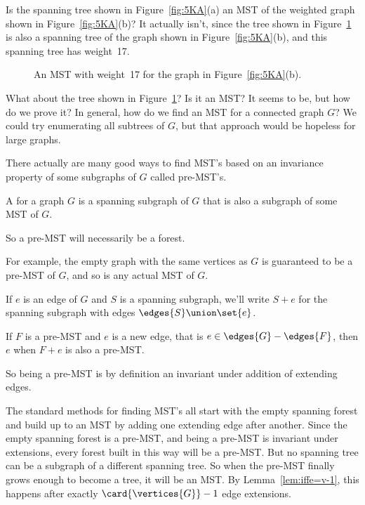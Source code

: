 Is the spanning tree shown in Figure~\ref{fig:5KA}(a) an MST of the
weighted graph shown in Figure~\ref{fig:5KA}(b)?  It actually isn't,
since the tree shown in Figure~\ref{fig:5KB} is also a spanning tree
of the graph shown in Figure~\ref{fig:5KA}(b), and this spanning tree
has weight~17.

\begin{figure}


\caption{An MST with weight~17 for the graph in
  Figure~\ref{fig:5KA}(b).}
\label{fig:5KB}

\end{figure}

What about the tree shown in Figure~\ref{fig:5KB}?  Is it an MST?  It
seems to be, but how do we prove it?  In general, how do we find an
MST for a connected graph $G$?  We could try enumerating all subtrees
of $G$, but that approach would be hopeless for large graphs.

\begin{editingnotes}
\end{editingnotes}
There actually are many good ways to find MST's based on an invariance
property of some subgraphs of $G$ called pre-MST's.

\begin{definition}
A  for a graph $G$ is a spanning
subgraph of $G$ that is also a subgraph of some MST of $G$.
\end{definition}
So a pre-MST will necessarily be a forest.

For example, the empty graph with the same vertices as $G$ is guaranteed
to be a pre-MST of $G$, and so is any actual MST of $G$.

 \iffalse In the rest of this section, subgraphs and forests will
 always be spanning forests and spanning subgraphs of $G$, that is
 they will have the same vertices as $G$.\fi

If $e$ is an edge of $G$ and $S$ is a spanning subgraph, we'll write
$S+e$ for the spanning subgraph with edges $\edges{S} \union \set{e}$.
\begin{definition}
If $F$ is a pre-MST and $e$ is a new edge, that is $e \in
\edges{G}-\edges{F}$, then $e$  when $F+e$ is also a
pre-MST.
\end{definition}
So being a pre-MST is by definition an invariant under addition of
extending edges.

The standard methods for finding MST's all start with the empty
spanning forest and build up to an MST by adding one extending edge
after another.  Since the empty spanning forest is a pre-MST, and
being a pre-MST is invariant under extensions, every forest built in
this way will be a pre-MST.  But no spanning tree can be a subgraph of
a different spanning tree.  So when the pre-MST finally grows enough
to become a tree, it will be an MST.  By Lemma~\ref{lem:iffe=v-1}, this
happens after exactly $\card{\vertices{G}}-1$ edge extensions.

